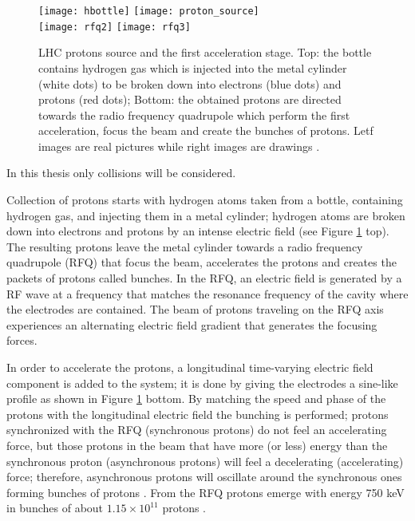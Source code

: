 \begin{figure}[!h]
\centering
\texttt{[image: hbottle]}
\texttt{[image: proton\_source]}\\
\texttt{[image: rfq2]}
\texttt{[image: rfq3]}
\caption[LHC protons source. First acceleration stage.]{LHC protons source and the first acceleration stage. Top: the bottle contains hydrogen gas which is injected into the metal cylinder (white dots) to be broken down into electrons (blue dots) and protons (red dots); Bottom: the obtained protons are directed towards the radio frequency quadrupole which perform the first acceleration, focus the beam and create the bunches of protons. Letf images are real pictures while right images are drawings \cite{rfq2,video}.}\label{fig:hbottle}
\end{figure}

\noindent In this thesis only \pp collisions will be considered.

Collection of protons starts with hydrogen atoms taken from a bottle, containing hydrogen gas, and injecting them in a metal cylinder; hydrogen atoms are broken down into electrons and protons by an intense electric field (see Figure \ref{fig:hbottle} top). The resulting protons leave the metal cylinder towards a radio frequency quadrupole (RFQ) that focus the beam, accelerates the protons and creates the packets of protons called bunches. In the RFQ, an electric field is generated by a RF wave at a frequency that matches the resonance frequency of the cavity where the electrodes are contained. The beam of protons traveling on the RFQ axis experiences an alternating electric field gradient that generates the focusing forces.

In order to accelerate the protons, a longitudinal time-varying electric field component is added to the system; it is done by giving the electrodes a sine-like profile as shown in Figure \ref{fig:hbottle} bottom. By matching the speed and phase of the protons with the longitudinal electric field the bunching is performed; protons synchronized with the RFQ (synchronous protons) do not feel an accelerating force, but those protons in the beam that have more (or less) energy than the synchronous proton (asynchronous protons) will feel a decelerating (accelerating) force; therefore, asynchronous protons will oscillate around the synchronous ones forming bunches of protons \cite{rfq}. From the RFQ protons emerge with energy 750 keV in bunches of about $1.15 \times 10^{11}$ protons \cite{lyndon}.        

